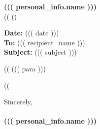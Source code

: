 \documentclass[11pt]{article}
\begin{document}
\begin{center}
    \textbf{\Large{((( personal_info.name )))}} \\ \vspace{0.4em}
    ((%
    ((%
\end{center}

\vspace{1.5em}

\noindent
\textbf{Date:} ((( date ))) \\
\textbf{To:} ((( recipient_name ))) \\
\textbf{Subject:} ((( subject )))

\vspace{1.5em}

((%
\noindent
((( para )))

\vspace{1.2em}
((%

\vspace{1.5em}

\noindent
Sincerely, \\
\vspace{1.5em} \\
\textbf{((( personal_info.name )))}
\end{document}
